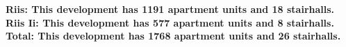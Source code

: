 \bf{Riis}: This development has 1191 apartment units and 18 stairhalls.\\\bf{Riis Ii}: This development has 577 apartment units and 8 stairhalls.\\\bf{Total}: This development has 1768 apartment units and 26 stairhalls.\\